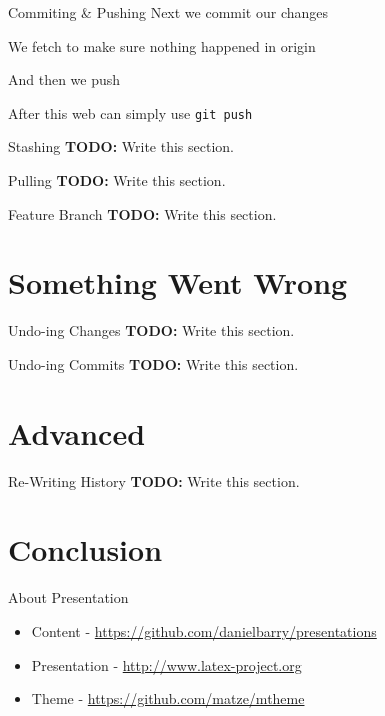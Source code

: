 \documentclass{beamer}
\begin{document}
  \begin{frame}[fragile=singleslide]{Commiting \& Pushing}
    Next we commit our changes
    
    We fetch to make sure nothing happened in origin
    
  \end{frame}
  \begin{frame}[fragile=singleslide]
    And then we push
    
    After this web can simply use \texttt{git push}
  \end{frame}
  \begin{frame}{Stashing}
    \textbf{TODO:} Write this section.
  \end{frame}
  \begin{frame}{Pulling}
    \textbf{TODO:} Write this section.
  \end{frame}
  \begin{frame}{Feature Branch}
    \textbf{TODO:} Write this section.
  \end{frame}
  \section{Something Went Wrong}
  \begin{frame}{Undo-ing Changes}
    \textbf{TODO:} Write this section.
  \end{frame}
  \begin{frame}{Undo-ing Commits}
    \textbf{TODO:} Write this section.
  \end{frame}
  \section{Advanced}
  \begin{frame}{Re-Writing History}
    \textbf{TODO:} Write this section.
  \end{frame}
  \section{Conclusion}
  \begin{frame}{About Presentation}
    \begin{itemize}
      \item Content - \url{https://github.com/danielbarry/presentations}
      \item Presentation - \url{http://www.latex-project.org}
      \item Theme - \url{https://github.com/matze/mtheme}
    \end{itemize}
  \end{frame}
\end{document}

